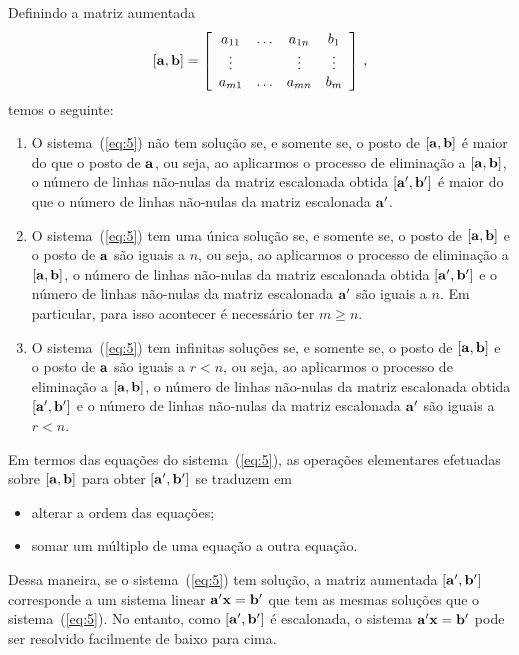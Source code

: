 \documentclass[12pt,a4paper]{article}
\newcommand{\dsqr}[1]{\left[#1\right]}
\theoremstyle{definition}
\begin{document}
Definindo a matriz aumentada
$$[{\bf a},{\bf b}]=\dsqr{
\begin{array}{cccc}
  a_{11}&\ldots&a_{1n}&b_1\\
  \vdots&&\vdots&\vdots\\
  a_{m1}&\ldots&a_{mn}&b_m
\end{array}
}\,,$$ temos o seguinte:
\begin{enumerate}
\item O sistema~(\ref{eq:5}) não tem solução se, e somente se, o posto
  de $[{\bf a},{\bf b}]$ é maior do que o posto de ${\bf a}$, ou seja,
  ao aplicarmos o processo de eliminação a $[{\bf a}, {\bf b}]$, o
  número de linhas não-nulas da matriz escalonada obtida
  $[{\bf a}',{\bf b}']$ é maior do que o número de linhas não-nulas da
  matriz escalonada ${\bf a}'$.
\item O sistema~(\ref{eq:5}) tem uma única solução se, e somente se, o
  posto de $[{\bf a},{\bf b}]$ e o posto de ${\bf a}$ são iguais a
  $n$, ou seja, ao aplicarmos o processo de eliminação a
  $[{\bf a}, {\bf b}]$, o número de linhas não-nulas da matriz
  escalonada obtida $[{\bf a}',{\bf b}']$ e o número de linhas
  não-nulas da matriz escalonada ${\bf a}'$ são iguais a $n$. Em
  particular, para isso acontecer é necessário ter $m\ge n$.
\item O sistema~(\ref{eq:5}) tem infinitas soluções se, e somente se,
  o posto de $[{\bf a},{\bf b}]$ e o posto de ${\bf a}$ são iguais a
  $r<n$, ou seja, ao aplicarmos o processo de eliminação a
  $[{\bf a}, {\bf b}]$, o número de linhas não-nulas da matriz
  escalonada obtida $[{\bf a}',{\bf b}']$ e o número de linhas
  não-nulas da matriz escalonada ${\bf a}'$ são iguais a $r<n$.
\end{enumerate}

Em termos das equações do sistema~(\ref{eq:5}), as operações
elementares efetuadas sobre $[{\bf a}, {\bf b}]$ para obter
$[{\bf a}',{\bf b}']$ se traduzem em
\begin{itemize}
\item alterar a ordem das equações;
\item somar um múltiplo de uma equação a outra equação.
\end{itemize}
Dessa maneira, se o sistema~(\ref{eq:5}) tem solução, a matriz
aumentada $[{\bf a}',{\bf b}']$ corresponde a um sistema linear
${\bf a}'{\bf x}={\bf b}'$ que tem as mesmas soluções que o
sistema~(\ref{eq:5}). No entanto, como $[{\bf a}',{\bf b}']$ é
escalonada, o sistema ${\bf a}'{\bf x}={\bf b}'$ pode ser resolvido
facilmente de baixo para cima.
\end{document}
